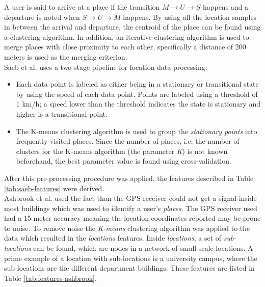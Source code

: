 A user is said to arrive at a place if the transition $M \rightarrow U \rightarrow S$ happens and a departure is noted when $S \rightarrow U \rightarrow M$ happens. By using all the location samples in between the arrival and departure, the centroid of the place can be found using a clustering algorithm. In addition, an iterative clustering algorithm is used to merge places with close proximity to each other, specifically a distance of 200 meters is used as the merging criterion. \\ 

Saeb et al. uses a two-stage pipeline for location data processing: 
\begin{itemize}
    \item Each data point is labeled as either being in a stationary or transitional state by using the speed of each data point. Points are labeled using a threshold of 1 km/h; a speed lower than the threshold indicates the state is stationary and higher is a transitional point. 
    \item The K-means clustering algorithm is used to group the \textit{stationary points} into frequently visited places. Since the number of places, i.e. the number of clusters for the K-means algorithm (the parameter \textit{K}) is not known beforehand, the best parameter value is found using cross-validation.
\end{itemize}

After this pre-processing procedure was applied, the features described in Table \ref{tab:saeb-features} were derived.\\ 

Ashbrook et al. used the fact than the GPS receiver could not get a signal inside most buildings which was used to identify a user's \textit{places}. The GPS receiver used had a 15 meter accuracy meaning the location coordinates reported may be prone to noise. To remove noise the \textit{K-means} clustering algorithm was applied to the data which resulted in the \textit{locations} features. Inside \textit{locations}, a set of \textit{sub-locations} can be found, which are nodes in a network of small-scale locations. A prime example of a location with sub-locations is a university campus, where the sub-locations are the different department buildings. These features are listed in Table \ref{tab:features-ashbrook}. \\ 

